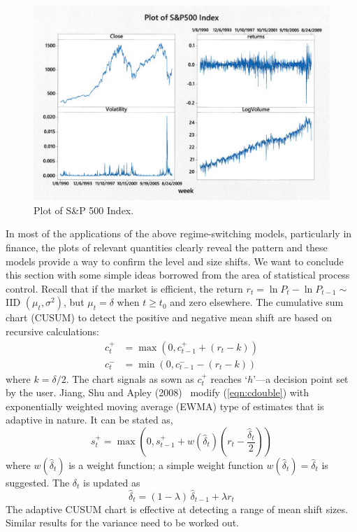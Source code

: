	\begin{figure}[!ht]
	\centering
	\includegraphics[width=\textwidth]{chapters/chapter_uvts/figures/sp500.png}
	\caption{Plot of S\&P 500 Index. \label{fig:sp500}}
	\end{figure}


In most of the applications of the above regime-switching models, particularly in finance, the plots of relevant quantities clearly reveal the pattern and these models provide a way to confirm the level and size shifts. We want to conclude this section with some simple ideas borrowed from the area of statistical process control. Recall that if the market is efficient, the return $r_t=\ln P_t - \ln P_{t-1}\sim $ IID $(\mu_t, \sigma^2)$, but $\mu_t=\delta$ when $t\geq t_0$ and zero elsewhere. The cumulative sum chart (CUSUM) to detect the positive and negative mean shift are based on recursive calculations:
	\begin{equation}\label{eqn:cdouble}
	\begin{split}
	c_t^+&=\max(0,c_{t-1}^+ + (r_t-k)) \\
	c_t^-&=\min(0,c_{t-1}^- - (r_t-k))
	\end{split}
	\end{equation}
where $k=\delta/2$. The chart signals as sown as $c_t^+$ reaches `$h$'---a decision point set by the user. Jiang, Shu and Apley (2008)~\cite{shuap} modify (\ref{eqn:cdouble}) with exponentially weighted moving average (EWMA) type of estimates that is adaptive in nature. It can be stated as,
	\begin{equation}\label{eqn:elma}
	s_t^+=\max\left(0,s_{t-1}^+ + w(\hat{\delta}_t)\left(r_t - \frac{\hat{\delta}_t}{2}\right)\right)
	\end{equation}
where $w(\hat{\delta}_t)$ is a weight function; a simple weight function $w(\hat{\delta}_t)=\hat{\delta}_t$ is suggested. The $\delta_t$ is updated as 
	\begin{equation}\label{eqn:updatedelt}
	\hat{\delta}_t=(1-\lambda)\, \hat{\delta}_{t-1} + \lambda r_t
	\end{equation}
The adaptive CUSUM chart is effective at detecting a range of mean shift sizes. Similar results for the variance need to be worked out.


